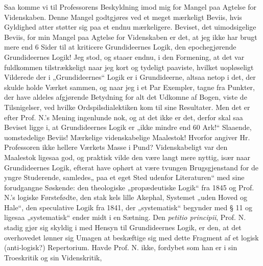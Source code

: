 \documentclass[12pt,a4paper]{book}
\newcommand{\opage}[1]{\marginnote{\footnotesize\textit{[#1]}}}
\begin{document}
Saa komme vi til Professorens Beskyldning imod mig for Mangel paa Agtelse for
Videnskaben. Denne Mangel godtgjøres ved et meget mærkeligt Beviis, hvis
Gyldighed atter støtter sig paa et endnu mærkeligere. Beviset, det uimodsigelige
Beviis, for min Mangel paa Agtelse for Videnskaben er det, at jeg ikke har brugt
mere end 6 Sider til at kriticere Grundideernes Logik, den epochegjørende
Grundideernes Logik! Jeg stod, og staaer endnu, i den Formening, at det var
fuldkommen tilstrækkeligt naar jeg kort og tydeligt paaviste, hvilket uopløseligt
Vilderede der i „Grundideernes“ Logik er i Grundideerne, altsaa netop i det, der
skulde holde Værket sammen, og naar jeg i et Par Exempler, tagne fra Punkter, der
have aldeles afgjørende Betydning for alt det Udkomne af Bogen, viste de
Tilsnigelser, ved hvilke Ordspilsdialektiken kom til sine Resultater. Men det er
efter Prof. N.'s Mening ingenlunde nok, og at det ikke er det, derfor skal saa
Beviset ligge i, at Grundideernes Logik er „ikke mindre end 60 Ark!“ Slaaende,
uomstødelige Beviis! Mærkelige videnskabelige Maalestok! Hvorfor angiver Hr.
Professoren ikke hellere Værkets Masse i Pund? Videnskabeligt var den Maalestok
ligesaa god, og praktisk vilde den være langt mere nyttig, især naar
Grundideernes Logik, efterat have ophørt at være tvungen Brugsgjenstand for de
yngre Studerende, samledes„ paa et eget Sted udenfor Literaturen“ med sine
forudgangne Søskende: den theologiske „propædeutiske Logik“ fra 1845 og
Prof. N.'s logiske Førstefødte, den stak\-%
\opage{22}%
kels lille Akephal, Systemet „uden Hoved og Hale“, den speculative Logik fra
1841, der „systematisk“ begynder med § 11 og ligesaa „systematisk“ ender midt i
en Sætning. Den \textit{petitio principii}, Prof. N. stadig gjør sig skyldig i
med Hensyn til Grundideernes Logik, er den, at det overhovedet lønner sig Umagen
at beskæftige sig med dette Fragment af et logisk (anti-logisk?) Repertorium.
Havde Prof. N. ikke, fordybet som han er i sin Troeskritik og sin Videnskritik,
\end{document}
